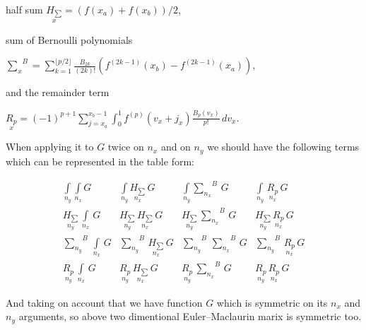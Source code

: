 \documentclass[twoside, 10pt]{article}
\begin{document}
\begin{multicols}{2}
\noindent
half sum \(\underset{x}{H_{\sum}}={\left( {f(x_a)+f(x_b)}\right)/{2}}\),

\noindent
sum of Bernoulli polynomials

\({\sum\limits_{x}^{}}^{B}=\sum _{k=1}^{\lfloor p/2\rfloor }{\frac {B_{2k}}{(2k)!}}\left(f^{(2k-1)}(x_b)-f^{(2k-1)}(x_a)\right)\),

\noindent
and the remainder term

\(\underset{x}{R_{p}}=(-1)^{p+1}\sum_{j=x_a}^{x_b-1} \int _{0}^{1}f^{(p)}(v_x+j_x){\frac {B_{p}(v_x)}{p!}}\,dv_x\).

When applying it to \(G\) twice on \(n_x\) and on \(n_y\) we should have
the following terms which can be represented in the table form:

    \begin{equation}
\begin{array}{cccc}
 \int\limits_{n_y}^{} \int\limits_{n_x}^{} G  &  \int\limits_{n_y}^{} \underset{n_x}{H_{\sum}}\,G  &  \int\limits_{n_y}^{}{\sum\limits_{n_x}^{}}^{B}\,G  &  \int\limits_{n_y}^{}\,\underset{n_x}{R_{p}}\,G  \\
 \underset{n_y}{H_{\sum}}\,\int\limits_{n_x}^{}\,G &  \underset{n_y}{H_{\sum}}\,\underset{n_x}{H_{\sum}}\,G &  \underset{n_y}{H_{\sum}}\,{\sum\limits_{n_x}^{}}^{B}\,G &  \underset{n_y}{H_{\sum}}\,\underset{n_x}{R_{p}}\,G \\
 {\sum\limits_{n_y}^{}}^{B}\,\int\limits_{n_x}^{}\,G  &  {\sum\limits_{n_y}^{}}^{B}\,\underset{n_x}{H_{\sum}}\,G  &  {\sum\limits_{n_y}^{}}^{B}\,{\sum\limits_{n_x}^{}}^{B}\,G  &  {\sum\limits_{n_y}^{}}^{B}\,\underset{n_x}{R_{p}}\,G  \\
 \underset{n_y}{R_{p}}\,\int\limits_{n_x}^{}\,G   &  \underset{n_y}{R_{p}}\,\underset{n_x}{H_{\sum}}\,G   &  \underset{n_y}{R_{p}}\,{\sum\limits_{n_x}^{}}^{B}\,G   &  \underset{n_y}{R_{p}}\,\underset{n_x}{R_{p}}\,G
\end{array}\end{equation}

    And taking on account that we have function \(G\) which is symmetric on
its \(n_x\) and \(n_y\) arguments, so above two dimentional
Euler--Maclaurin marix is symmetric too.


    \section*{}\label{summary-of-eulermaclaurin-2d}
\vspace{-3.5mm}


\end{multicols}
\end{document}
